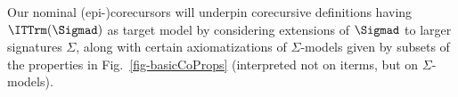 Our nominal (epi-)corecursors will underpin corecursive definitions having $\ITTrm(\Sigmad)$ as target 
model by considering extensions of $\Sigmad$ to larger signatures $\Sigma$, along with certain axiomatizations of $\Sigma$-models given by subsets of the properties in Fig.~\ref{fig-basicCoProps} (interpreted not on iterms, but on $\Sigma$-models). 




\newcommand\perFreeCoRec
{
	\begin{tabular}{|c|}
		\hline
		$\ccr_1$ \ (perm/free)%
		\\\hline
		\IPmVr{}, \IPmAp{}, \IPmLm{}, 
		\\
		\IPmId{}, \IPmCp{},  
		\\
		\IFvDPm{}, \IPmBvr{}
		\\\hline
	\end{tabular}	
}

\newcommand\perFreeBVrCoRec
{
	\begin{tabular}{|c|}
		\hline
		$\ccr_{2}$ \ (perm/free variant)%
		\\\hline
		\IPmVr{}, \IPmAp{}, \IPmLm{}, 
		\\
		\IPmId{}, \IPmCp{},  
		\\
		\IPmFv{},  
		\IPmBvr{}, 
		\\
		\IFvVr{}, \IFvAp{}, \IFvLm{}  
		\\\hline
	\end{tabular}	
}

\newcommand\swapFreeCoRecV
{
	\begin{tabular}{|c|}
		\hline
		$\ccr_3$ \ (swap/free variant)%
		\\\hline
		\ISwVr{}, \ISwAp{}, \ISwLm{}, 
		\\
		\ISwId{}, \ISwIv{},  \ISwCp{},  
		\\
		\IFvDSw{}, \ISwBvrT{}
		\\\hline
	\end{tabular}	
}

\newcommand\swapFreeBVrCoRec
{
	\begin{tabular}{|c|}
		\hline
		$\ccr_{5}$ \ (swap/fresh variant)
		\\\hline
		\ISwVr{}, \ISwAp{}, \ISwLm{}, 
		\\
		\hlt{$\ISwId{}$}, \hlt{$\ISwIv{}$},  \hlt{$\ISwCp{}$},  
		\\
		\ISwFr{}, 
		\ISwBvr{}, 
		\\
		\IFrVr{}, \IFrAp{}, \IFrLm{}  
		\\\hline 
	\end{tabular}	
}


